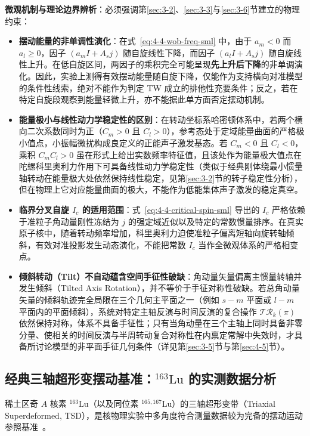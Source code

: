 \textbf{微观机制与理论边界辨析}：必须强调第\ref{sec:3-2}、\ref{sec:3-3}与\ref{sec:3-6}节建立的物理约束：
\begin{itemize}
\item \textbf{摆动能量的非单调性演化}：在式~\eqref{eq:4-4-wob-freq-sml} 中，由于 $a_m < 0$ 而 $a_l \ge 0$，因子 $(a_m I + A_s j)$ 随自旋线性下降，而因子 $(a_l I + A_s j)$ 随自旋线性上升。在低自旋区间，两因子的乘积完全可能呈现\textbf{先上升后下降}的非单调演化。因此，实验上测得有效摆动能量随自旋下降，仅能作为支持横向对准模型的条件性线索，绝对不能作为判定 TW 成立的排他性充要条件；反之，若在特定自旋段观察到能量轻微上升，亦不能据此单方面否定摆动机制。
\item \textbf{能量极小与线性动力学稳定性的区别}：在转动坐标系哈密顿体系中，若两个横向二次系数同时为正（$C_m > 0$ 且 $C_l > 0$），参考态处于定域能量曲面的严格极小值点，小振幅微扰构成良定义的正能声子激发基态。若 $C_m < 0$ 且 $C_l < 0$，乘积 $C_m C_l > 0$ 虽在形式上给出实数频率特征值，且该处作为能量极大值点在陀螺科里奥利力作用下可具备线性动力学稳定性（类似于经典刚体绕最小惯量轴转动在能量极大处依然保持线性稳定，见第\ref{sec:3-2}节的转子稳定性分析），但在物理上它对应能量曲面的极大，不能作为低能集体声子激发的稳定真空。
\item \textbf{临界分叉自旋 $I_c$ 的适用范围}：式~\eqref{eq:4-4-critical-spin-sml} 导出的 $I_c$ 严格依赖于准粒子角动量刚性冻结为 $j$ 的强定域近似以及特定的常数惯量排序。在真实原子核中，随着转动频率增加，科里奥利力迫使准粒子偏离短轴向旋转轴倾斜，有效对准投影发生动态演化，不能把常数 $I_c$ 当作全微观体系的严格相变点。
\item \textbf{倾斜转动（Tilt）不自动蕴含空间手征性破缺}：角动量矢量偏离主惯量转轴并发生倾斜（Tilted Axis Rotation），并不等价于手征对称性破缺。若总角动量矢量的倾斜轨迹完全局限在三个几何主平面之一（例如 $s-m$ 平面或 $l-m$ 平面内的平面倾斜），系统对特定主轴反演与时间反演的复合操作 $\mathcal{T}\mathcal{R}_k(\pi)$ 依然保持对称，体系不具备手征性；只有当角动量在三个主轴上同时具备非零分量、使相关的时间反演与半周转动复合对称性在内禀定常解中失效时，才具备所讨论模型的非平面手征几何条件（详见第\ref{sec:3-5}节与第\ref{sec:4-5}节）。
\end{itemize}

\subsection{经典三轴超形变摆动基准：$^{163}\mathrm{Lu}$ 的实测数据分析}\label{sec:4-4-2}

稀土区奇 $A$ 核素 $^{163}\mathrm{Lu}$（以及同位素 $^{165,167}\mathrm{Lu}$）的三轴超形变带（Triaxial Superdeformed, TSD），是核物理实验中多角度符合测量数据较为完备的摆动运动参照基准~\cite{odegard-2001-evidence-wobbling-163lu,jensen-2002-second-phonon-wobbling-163lu,campaign-g07-gorgen-2004-163lu-quadrupole-moments}。

